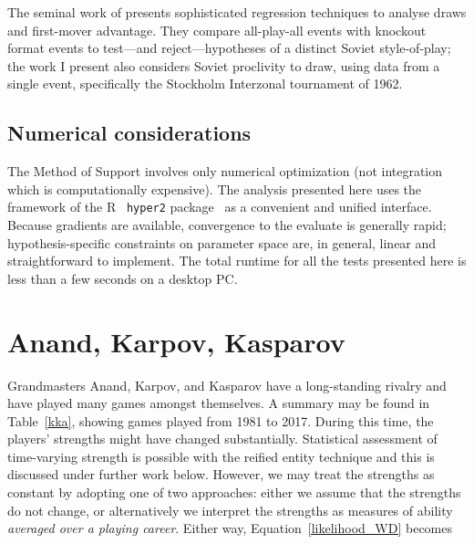 \documentclass[review]{elsarticle}
\begin{document}
The seminal work of \citet{moul2009} presents
  sophisticated regression techniques to analyse draws and first-mover
  advantage.  They compare all-play-all events with knockout format
  events to test---and reject---hypotheses of a distinct Soviet
  style-of-play; the work I present also considers Soviet proclivity
  to draw, using data from a single event, specifically the Stockholm
  Interzonal tournament of 1962.

\subsection{Numerical considerations}

The Method of Support \citep{edwards1972} involves only numerical
optimization (not integration which is computationally expensive).
The analysis presented here uses the framework of the
R~\citep{rcore2019} {\tt hyper2} package~\citep{hankin2017} as a
convenient and unified interface.  Because gradients are available,
convergence to the evaluate is generally rapid; hypothesis-specific
constraints on parameter space are, in general, linear and
straightforward to implement.  The total runtime for all the tests
presented here is less than a few seconds on a desktop PC.

\section{Anand, Karpov, Kasparov}

Grandmasters Anand, Karpov, and Kasparov have a long-standing rivalry
and have played many games amongst themselves.  A summary may be found
in Table~\ref{kka}, showing games played from 1981 to
  2017.  During this time, the players' strengths might have changed
  substantially.  Statistical assessment of time-varying strength is
  possible with the reified entity technique and this is discussed
  under further work below.  However, we may treat the strengths as
  constant by adopting one of two approaches: either we assume that
  the strengths do not change, or alternatively we interpret the
  strengths as measures of ability {\em averaged over a playing
    career}.  Either way, Equation~\ref{likelihood_WD} becomes
\end{document}
